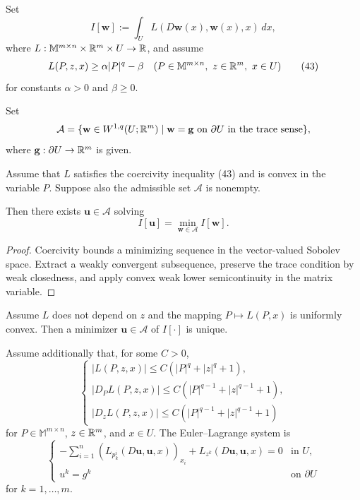 Set
\[
I[\mathbf w]:=\int_U L(D\mathbf w(x),\mathbf w(x),x)\,dx,
\]
where $L:\mathbb M^{m\times n}\times\mathbb{R}^m\times U\to\mathbb{R}$, and assume
\[
L(P,z,x)\geq\alpha|P|^q-\beta
\quad(P\in\mathbb M^{m\times n},\ z\in\mathbb{R}^m,\ x\in U)
\tag{43}
\]
for constants $\alpha>0$ and $\beta\geq0$.

\begin{definition}
\label{def:admissible-class-systems}
Set
\[
\mathcal{A} = \{\mathbf{w} \in W^{1,q}(U; \mathbb{R}^m) \mid \mathbf{w} = \mathbf{g} \text{ on } \partial U \text{ in the trace sense}\},
\]
where $\mathbf{g} : \partial U \to \mathbb{R}^m$ is given.
\end{definition}

\begin{theorem}
\label{thm:existence-minimizer-systems}

Assume that $L$ satisfies the coercivity inequality (43) and is convex in the variable $P$. Suppose also the admissible set $\mathcal{A}$ is nonempty.

Then there exists $\mathbf{u} \in \mathcal{A}$ solving
\[
I[\mathbf{u}] = \min_{\mathbf{w} \in \mathcal{A}} I[\mathbf{w}].
\]
\end{theorem}

\begin{proof}
\sketch Coercivity bounds a minimizing sequence in the vector-valued Sobolev space. Extract a weakly convergent subsequence, preserve the trace condition by weak closedness, and apply convex weak lower semicontinuity in the matrix variable.
\end{proof}

\begin{theorem}
\label{thm:uniqueness-minimizer-systems}

Assume $L$ does not depend on $z$ and the mapping $P \mapsto L(P, x)$ is uniformly convex. Then a minimizer $\mathbf{u} \in \mathcal{A}$ of $I[\cdot]$ is unique.
\end{theorem}

Assume additionally that, for some $C>0$,
\[
\begin{cases}
|L(P,z,x)|\leq C(|P|^q+|z|^q+1),\\
|D_PL(P,z,x)|\leq C(|P|^{q-1}+|z|^{q-1}+1),\\
|D_zL(P,z,x)|\leq C(|P|^{q-1}+|z|^{q-1}+1)
\end{cases}
\tag{44}
\]
for $P\in\mathbb M^{m\times n}$, $z\in\mathbb{R}^m$, and $x\in U$. The Euler--Lagrange system is
\[
\begin{cases}
-\displaystyle\sum_{i=1}^n(L_{p_k^i}(D\mathbf u,\mathbf u,x))_{x_i}
+L_{z^k}(D\mathbf u,\mathbf u,x)=0 & \text{in }U,\\
u^k=g^k & \text{on }\partial U
\end{cases}
\tag{45}
\]
for $k=1,\ldots,m$.

